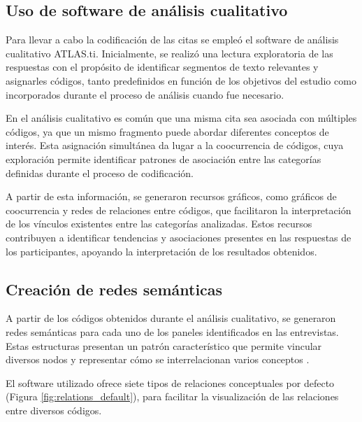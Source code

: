         

    \subsection{Uso de software de análisis cualitativo}

        Para llevar a cabo la codificación de las citas se empleó el software de análisis cualitativo ATLAS.ti. Inicialmente, se realizó una lectura exploratoria de las respuestas con el propósito de identificar segmentos de texto relevantes y asignarles códigos, tanto predefinidos en función de los objetivos del estudio como incorporados durante el proceso de análisis cuando fue necesario.

        En el análisis cualitativo es común que una misma cita sea asociada con múltiples códigos, ya que un mismo fragmento puede abordar diferentes conceptos de interés. Esta asignación simultánea da lugar a la coocurrencia de códigos, cuya exploración permite identificar patrones de asociación entre las categorías definidas durante el proceso de codificación.

        A partir de esta información, se generaron recursos gráficos, como gráficos de coocurrencia y redes de relaciones entre códigos, que facilitaron la interpretación de los vínculos existentes entre las categorías analizadas. Estos recursos contribuyen a identificar tendencias y asociaciones presentes en las respuestas de los participantes, apoyando la interpretación de los resultados obtenidos.

    \subsection{Creación de redes semánticas}

        A partir de los códigos obtenidos durante el análisis cualitativo, se generaron redes semánticas para cada uno de los paneles identificados en las entrevistas. Estas estructuras presentan un patrón característico que permite vincular diversos nodos y representar cómo se interrelacionan varios conceptos \parencite{PEREZ:2022}.

        El software utilizado ofrece siete tipos de relaciones conceptuales por defecto (Figura \ref{fig:relations_default}), para facilitar la visualización de las relaciones entre diversos códigos.
        
        

